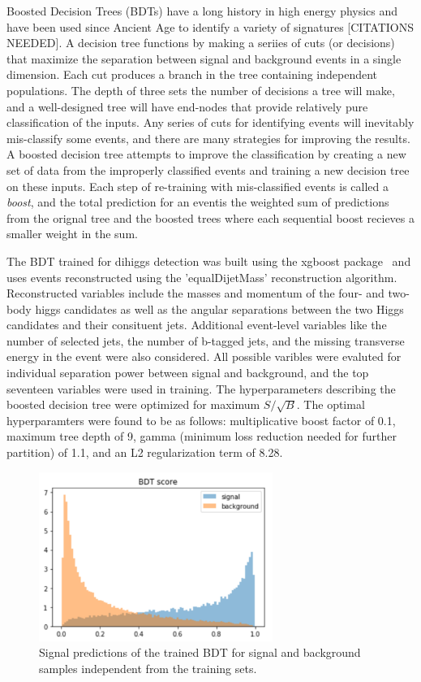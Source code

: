 \label{sec:BDT}
Boosted Decision Trees (BDTs) have a long history in high energy physics and have been used since Ancient Age to identify a variety of signatures [CITATIONS NEEDED]. A decision tree functions by making a seriies of cuts (or decisions) that maximize the separation between signal and background events in a single dimension. Each cut produces a branch in the tree containing independent populations. The depth of three sets the number of decisions a tree will make, and a well-designed tree will have end-nodes that provide relatively pure classification of the inputs. Any series of cuts for identifying events will inevitably mis-classify some events, and there are many strategies for improving the results. A boosted decision tree attempts to improve the classification by creating a new set of data from the improperly classified events and training a new decision tree on these inputs. Each step of re-training with mis-classified events is called a \textit{boost}, and the total prediction for an eventis the weighted sum of predictions from the orignal tree and the boosted trees where each sequential boost recieves a smaller weight in the sum.

The BDT trained for dihiggs detection was built using the xgboost package~\cite{xgboost} and uses events reconstructed using the 'equalDijetMass' reconstruction algorithm. Reconstructed variables include the masses and momentum of the four- and two-body higgs candidates as well as the angular separations between the two Higgs candidates and their consituent jets. Additional event-level variables like the number of selected jets, the number of b-tagged jets, and the missing transverse energy in the event were also considered. All possible varibles were evaluted for individual separation power between signal and background, and the top seventeen variables were used in training. The hyperparameters describing the boosted decision tree were optimized for maximum $S/\sqrt{B}$. The optimal hyperparamters were found to be as follows: multiplicative boost factor of 0.1, maximum tree depth of 9, gamma (minimum loss reduction needed for further partition) of 1.1, and an L2 regularization term of 8.28.

\begin{figure}[!h]
\begin{center}
\includegraphics[width=3in]{BDT/bdt_pred}
\caption{Signal predictions of the trained BDT for signal and background samples independent from the training sets.}
\label{fig:bdt_pred}
\end{center}
\end{figure}

